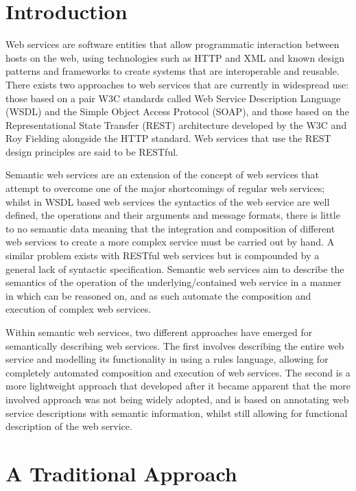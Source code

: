 \section{Introduction}

Web services are software entities that allow programmatic interaction between
hosts on the web, using technologies such as HTTP and XML and known design patterns and
frameworks to create systems that are interoperable and reusable. There
exists
two approaches to web services that are currently in widespread use: those based
on a pair W3C standards called Web Service Description Language (WSDL) and the
Simple Object Access Protocol (SOAP), and those based on the 
Representational State Transfer (REST) architecture developed by the W3C and Roy
Fielding alongside the HTTP standard. Web services that use the REST design
principles are said to be RESTful.

Semantic web services are an extension of the concept of web services that
attempt to overcome one of the major shortcomings of regular web services;
whilst in WSDL based web services the syntactics of the web service are well
defined, the operations and their arguments and message formats, there is
little to no semantic data meaning that the integration and
composition of different web services to create a more complex service must be
carried out by hand. A similar problem exists with RESTful web services but is
compounded by a general lack of syntactic specification. Semantic web services
aim to describe the semantics of the operation of the underlying/contained web
service in a manner in which can be reasoned on, and as such automate the
composition and execution of complex web services\cite{mcilraith_semantic_2001}.

Within semantic web services, two different approaches have emerged for
semantically describing web services. The first involves describing the entire
web service and modelling its functionality in using a rules language, allowing
for completely automated composition and execution of web services. The second
is a more lightweight approach that developed after it became apparent that the
more involved approach was not being widely adopted\cite{battle_report_????},
and is based on annotating web service descriptions with semantic information,
whilst still allowing for functional description of the web
service\cite{kopecky_sawsdl:_2007}.

\section{A Traditional Approach}

